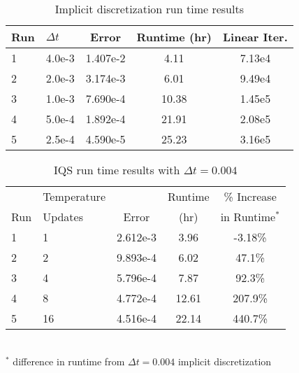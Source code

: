 \begin{table}[!htbp]
\begin{center}
\begin{tabular}{|l|l|ccc|}
\hline
Run  &  $\Delta t$ & Error & Runtime (hr) & Linear Iter.\\
\hline
1	& 4.0e-3	& 1.407e-2 	& 4.11	& 7.13e4	\\
2	& 2.0e-3	& 3.174e-3 	& 6.01	& 9.49e4 	\\
3 	& 1.0e-3 	& 7.690e-4 	& 10.38	& 1.45e5	\\
4 	& 5.0e-4 	& 1.892e-4 	& 21.91	& 2.08e5	\\
5 	& 2.5e-4	& 4.590e-5 	& 25.23	& 3.16e5	\\
\hline
\end{tabular}
\end{center}
\caption{Implicit discretization run time results}
\label{tab:ndiff_lra}
\end{table}

\begin{table}[!htbp]
\begin{center}
\begin{tabular}{|l|l|ccc|}
\hline
	&  Temperature 	&  		& Runtime 	& \% Increase	\\
Run	&  Updates 	& Error & (hr)		& in Runtime$^*$\\
\hline
1	& 1		& 2.612e-3 	& 3.96 	& -3.18\%	\\
2	& 2		& 9.893e-4 	& 6.02	&  47.1\%	\\
3 	& 4 	& 5.796e-4 	& 7.87	&  92.3\%	\\
4 	& 8 	& 4.772e-4 	& 12.61	& 207.9\% 	\\
5 	& 16	& 4.516e-4 	& 22.14	& 440.7\%	\\
\hline
\end{tabular}
\\
$^*$ difference in runtime from $\Delta t = 0.004$ implicit discretization 
\caption{IQS run time results with $\Delta t = 0.004$}
\label{tab:iqs_lra}
\end{center}
\end{table}

